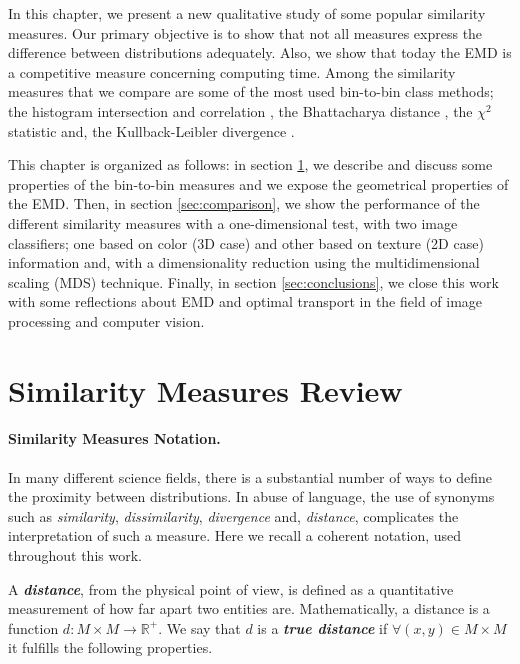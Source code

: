 In this chapter, we present a new qualitative study of some popular similarity measures. Our primary objective is to show that not all measures express the difference between distributions adequately. Also, we show that today the EMD is a competitive measure concerning computing time. Among the similarity measures that we compare are some of the most used bin-to-bin class methods; the histogram intersection and correlation \citep{Nejhum.Ho.ea:CVPR:2008}, the Bhattacharya distance \citep{So.Chung:JPR:2017}, the $\chi^2$ statistic and, the  Kullback-Leibler divergence \citep{Klein.Frintrop:CV:2011}. 

This chapter is organized as follows: in section \ref{sec:measures}, we describe and discuss some properties of the bin-to-bin measures and we expose the geometrical properties of the EMD. Then, in section \ref{sec:comparison}, we show the performance of the different similarity measures with a one-dimensional test, with two image classifiers; one based on color (3D case) and other based on texture (2D case) information and, with a dimensionality reduction using the multidimensional scaling (MDS) technique. Finally, in section \ref{sec:conclusions}, we close this work with some reflections about EMD and optimal transport in the field of image processing and computer vision.


\section{Similarity Measures Review}\label{sec:measures}

\paragraph{Similarity Measures Notation.}
In many different science fields, there is a substantial number of ways to define the proximity between distributions. In abuse of language, the use of synonyms such as \textit{similarity}, \textit{dissimilarity}, \textit{divergence} and, \textit{distance}, complicates the interpretation of such a measure. Here we recall a coherent notation, used throughout this work.

A \textbf{\textit{distance}}, from the physical point of view, is defined as a quantitative measurement of how far apart two entities are. Mathematically, a distance is a function $d : M \times M \rightarrow \mathbb{R}^+$. We say that $d$ is a \textbf{\textit{true distance}} if $\forall (x, y) \in M \times M$ it fulfills the following properties.

